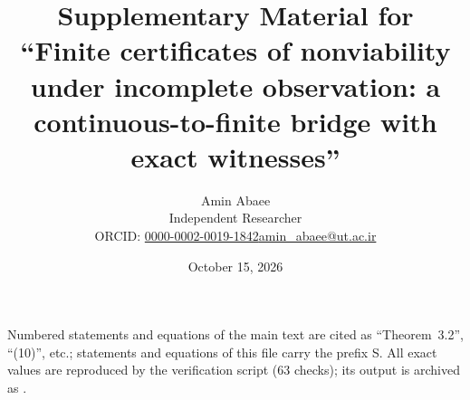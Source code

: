 \documentclass[11pt,a4paper]{article}
\title{\textbf{Supplementary Material for\\ ``Finite certificates of nonviability under incomplete observation: a continuous-to-finite bridge with exact witnesses''}}
\author{Amin Abaee\\[0.3em]{\small Independent Researcher}\\[0.2em]{\small ORCID: \href{https://orcid.org/0000-0002-0019-1842}{0000-0002-0019-1842}\quad \href{mailto:amin_abaee@ut.ac.ir}{amin\_abaee@ut.ac.ir}}}
\date{October 15, 2026}
\theoremstyle{plain}
\theoremstyle{definition}
\theoremstyle{remark}
\begin{document}
\maketitle

\noindent
Numbered statements and equations of the main text are cited as ``Theorem~3.2'', ``(10)'', etc.; statements and equations of this file carry the prefix S. All exact values are reproduced by the verification script  (63 checks); its output is archived as .

\tableofcontents
\end{document}
